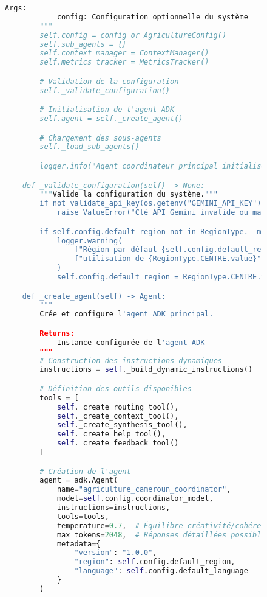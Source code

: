\begin{figure}[H]
\begin{lstlisting}[language=Python, caption=Structure complète de l'agent principal]
        Args:
            config: Configuration optionnelle du système
        """
        self.config = config or AgricultureConfig()
        self.sub_agents = {}
        self.context_manager = ContextManager()
        self.metrics_tracker = MetricsTracker()

        # Validation de la configuration
        self._validate_configuration()

        # Initialisation de l'agent ADK
        self.agent = self._create_agent()

        # Chargement des sous-agents
        self._load_sub_agents()

        logger.info("Agent coordinateur principal initialisé avec succès")

    def _validate_configuration(self) -> None:
        """Valide la configuration du système."""
        if not validate_api_key(os.getenv("GEMINI_API_KEY")):
            raise ValueError("Clé API Gemini invalide ou manquante")

        if self.config.default_region not in RegionType.__members__:
            logger.warning(
                f"Région par défaut {self.config.default_region} invalide, "
                f"utilisation de {RegionType.CENTRE.value}"
            )
            self.config.default_region = RegionType.CENTRE.value

    def _create_agent(self) -> Agent:
        """
        Crée et configure l'agent ADK principal.

        Returns:
            Instance configurée de l'agent ADK
        """
        # Construction des instructions dynamiques
        instructions = self._build_dynamic_instructions()

        # Définition des outils disponibles
        tools = [
            self._create_routing_tool(),
            self._create_context_tool(),
            self._create_synthesis_tool(),
            self._create_help_tool(),
            self._create_feedback_tool()
        ]

        # Création de l'agent
        agent = adk.Agent(
            name="agriculture_cameroun_coordinator",
            model=self.config.coordinator_model,
            instructions=instructions,
            tools=tools,
            temperature=0.7,  # Équilibre créativité/cohérence
            max_tokens=2048,  # Réponses détaillées possibles
            metadata={
                "version": "1.0.0",
                "region": self.config.default_region,
                "language": self.config.default_language
            }
        )


\end{lstlisting}
\end{figure}
